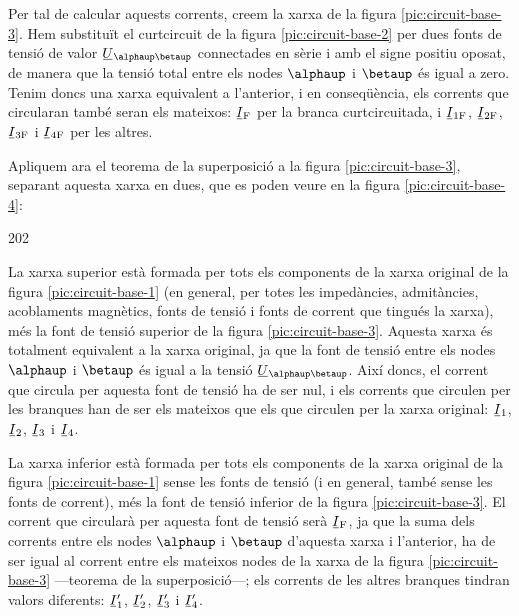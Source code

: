 \begin{center}
	
	\label{pic:circuit-base-2}
\end{center}


Per tal de calcular aquests corrents, creem  la xarxa de la figura  \vref{pic:circuit-base-3}. Hem substituït el curtcircuit de la  figura \vref{pic:circuit-base-2} per dues fonts de tensió de valor $\cmplx{U}_{\alphaup\betaup}$ connectades en sèrie i amb el signe positiu oposat, de manera que la tensió total entre els nodes $\alphaup$ i $\betaup$ és igual a zero. Tenim doncs una xarxa equivalent a l'anterior, i en conseqüència, els corrents que circularan també seran els mateixos: $\cmplx{I}\ped{F}$ per la branca curtcircuitada, i  $\cmplx{I}\ped{1F}$, $\cmplx{I}\ped{2F}$, $\cmplx{I}\ped{3F}$ i $\cmplx{I}\ped{4F}$ per les altres.

\begin{center}
	
	\label{pic:circuit-base-3}
\end{center}

Apliquem ara el teorema de la superposició a la figura \vref{pic:circuit-base-3}, separant aquesta xarxa en dues, que es poden veure en la figura \vref{pic:circuit-base-4}:
\begin{dingautolist}{202}
	\item La xarxa superior està formada per tots els  components de la xarxa original de la figura \vref{pic:circuit-base-1} (en general, per totes les impedàncies, admitàncies, acoblaments magnètics, fonts de tensió i fonts de corrent que tingués la xarxa), més la font de tensió superior de la figura \vref{pic:circuit-base-3}. Aquesta xarxa és totalment equivalent a la xarxa original, ja que la font de tensió entre els nodes $\alphaup$ i $\betaup$ és igual  a  la tensió $\cmplx{U}_{\alphaup\betaup}$. Així doncs, el corrent que circula per aquesta font de tensió ha de ser nul, i els corrents que circulen per les branques han de ser els mateixos que els que circulen per la xarxa original: $\cmplx{I}_1$, $\cmplx{I}_2$, $\cmplx{I}_3$ i $\cmplx{I}_4$.
	
	\item  La xarxa inferior està formada per tots els  components de la xarxa original de la figura \vref{pic:circuit-base-1} sense les fonts de tensió (i en general, també sense les fonts de corrent),  més la font de tensió inferior de la figura \vref{pic:circuit-base-3}. El corrent que circularà per aquesta font de tensió serà $\cmplx{I}\ped{F}$, ja que la suma dels corrents entre els nodes $\alphaup$ i $\betaup$ d'aquesta xarxa i l'anterior, ha de ser igual al corrent entre els mateixos nodes  de la xarxa de la  figura \vref{pic:circuit-base-3} ---teorema de la superposició---; els corrents de les altres branques tindran valors diferents: $\cmplx{I}_1'$, $\cmplx{I}_2'$, $\cmplx{I}_3'$ i $\cmplx{I}_4'$.
\end{dingautolist}

